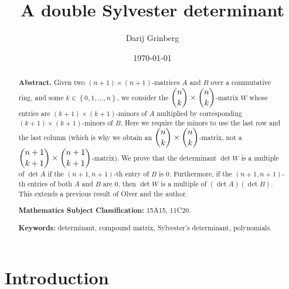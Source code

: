 \documentclass[numbers=enddot,12pt,final,onecolumn,notitlepage]{scrartcl}%
\theoremstyle{definition}
\begin{document}
\title{A double Sylvester determinant}
\author{Darij Grinberg}
\date{
\today
}
\maketitle

\begin{abstract}
\textbf{Abstract.} Given two $\left(  n+1\right)  \times\left(  n+1\right)
$-matrices $A$ and $B$ over a commutative ring, and some $k\in\left\{
0,1,\ldots,n\right\}  $, we consider the $\dbinom{n}{k}\times\dbinom{n}{k}%
$-matrix $W$ whose entries are $\left(  k+1\right)  \times\left(  k+1\right)
$-minors of $A$ multiplied by corresponding $\left(  k+1\right)  \times\left(
k+1\right)  $-minors of $B$. Here we require the minors to use the last row
and the last column (which is why we obtain an $\dbinom{n}{k}\times\dbinom
{n}{k}$-matrix, not a $\dbinom{n+1}{k+1}\times\dbinom{n+1}{k+1}$-matrix). We
prove that the determinant $\det W$ is a multiple of $\det A$ if the $\left(
n+1,n+1\right)  $-th entry of $B$ is $0$. Furthermore, if the $\left(
n+1,n+1\right)  $-th entries of both $A$ and $B$ are $0$, then $\det W$ is a
multiple of $\left(  \det A\right)  \left(  \det B\right)  $. This extends a
previous result of Olver and the author.

\textbf{Mathematics Subject Classification:} 15A15, 11C20.

\textbf{Keywords:} determinant, compound matrix, Sylvester's determinant, polynomials.

\end{abstract}
\tableofcontents

\section{Introduction}
\end{document}
